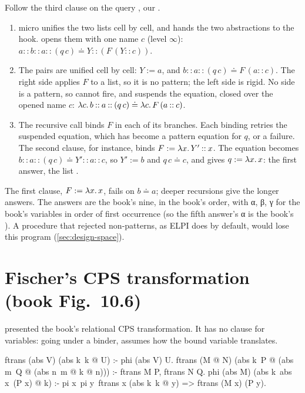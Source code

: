 {\begin{tutorial}
Follow the third clause on the query , our .
\begin{enumerate}
  \item micro unifies the two lists  cell by cell, and hands the two abstractions to
    the hook.  opens them with one name $c$ (level $\infty$):
    $a\mathbin{::}b\mathbin{::}a\mathbin{::}(q\,c)\doteq Y\mathbin{::}(F\,(Y\mathbin{::}c))$.
  \item The pairs are unified cell by cell: $Y:=a$, and $b\mathbin{::}a\mathbin{::}(q\,c)\doteq F\,(a\mathbin{::}c)$. The right side
    applies $F$ to a list, so it is no pattern; the left side is rigid. No side is a pattern, so
     cannot fire, and  suspends the equation, closed over the opened name
    $c$: $\lambda c.\,b\mathbin{::}a\mathbin{::}(q\,c)\doteq\lambda c.\,F\,(a\mathbin{::}c)$.
  \item The recursive call  binds $F$ in each of its branches. Each
    binding retries the suspended equation, which has become a pattern equation for $q$, or a
    failure. The second clause, for instance, binds $F:=\lambda x.\,Y'\mathbin{::}x$. The equation becomes
    $b\mathbin{::}a\mathbin{::}(q\,c)\doteq Y'\mathbin{::}a\mathbin{::}c$, so $Y':=b$ and $q\,c\doteq c$, and  gives
    $q:=\lambda x.\,x$: the first answer, the list .
\end{enumerate}
The first clause, $F:=\lambda x.\,x$, fails on $b\doteq a$; deeper recursions give the longer answers.
The answers are the book's nine, in the book's order, with α, β, γ for the book's variables in
order of first occurrence (so the fifth answer's α is the book's ). A
procedure that rejected non-patterns, as ELPI does by default, would lose this program (\cref{sec:design-space}).
\end{tutorial}

\section{Fischer's CPS transformation (book Fig.~10.6)}\label{sec:examples-cps}

 presented the book's relational CPS transformation. It has no clause for
variables: going under a binder,  assumes how the bound variable translates.
\begin{lprolog}
ftrans (abs V) (abs k\ k @ U) :- phi (abs V) U.
ftrans (M @ N) (abs k\ P @ (abs m\ Q @ (abs n\ m @ k @ n))) :-
   ftrans M P, ftrans N Q.
phi (abs M) (abs k\ abs x\ (P x) @ k) :-
   pi x\ pi y\ ftrans x (abs k\ k @ y) => ftrans (M x) (P y).


\end{lprolog}}
